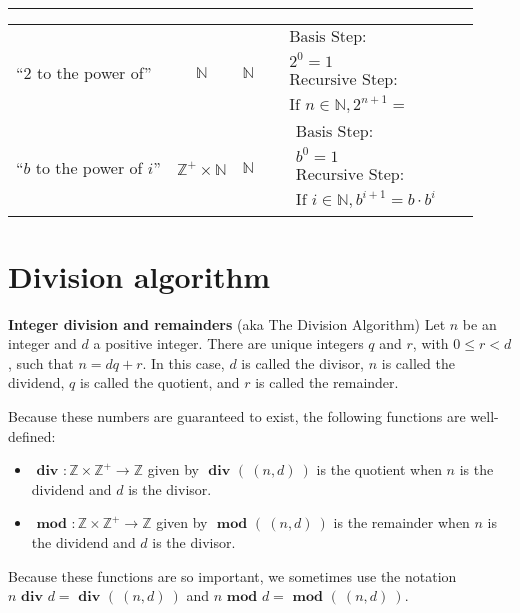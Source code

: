 \documentclass[12pt, oneside]{article}
\begin{document}
\begin{center}
\begin{tabular}{p{0.65in}ccp{2.4in}p{2.4in}}
{\begin{align*}
    \end{align*}}\\
\hline
``$2$ to the power of''& $\mathbb{N}$ & $\mathbb{N}$ & 
{\begin{align*}    
&\textrm{Basis Step:} \\
&2^0= 1 \\
&\textrm{Recursive Step:}\\
&\textrm{If } n \in \mathbb{N}, 2^{n+1} = \phantom{2 \cdot 2^n}
\end{align*}}\\
\hline
``$b$ to the power of $i$''& $\mathbb{Z}^+ \times \mathbb{N}$ & $\mathbb{N}$ & 
{\begin{align*}    
&\textrm{Basis Step:} \\
&b^0 = 1 \\
&\textrm{Recursive Step:}\\
&\textrm{If } i \in \mathbb{N}, b^{i+1} = b \cdot b^i
\end{align*}}
\end{tabular}
\end{center}

\newpage \vfill
\section*{Division algorithm}


{\bf Integer division and remainders} (aka The Division Algorithm) Let $n$ be an integer 
and $d$ a positive integer. There are unique integers $q$ and $r$, with $0 \leq r < d$, such that 
$n = dq + r$. In this case, $d$ is called the divisor, $n$ is called the dividend, 
$q$ is called the quotient, 
and $r$ is called the remainder. 

Because these numbers are guaranteed to exist, the following functions are well-defined: 
\begin{itemize}\setlength{\leftmargin}{-0.25in}
\item $\textbf{ div } : \mathbb{Z} \times \mathbb{Z}^+ \to \mathbb{Z}$ given by $\textbf{ div } ( ~(n,d)~)$ 
is the quotient when $n$ is the dividend and $d$ is the divisor.
\item $\textbf{ mod } : \mathbb{Z} \times \mathbb{Z}^+ \to \mathbb{Z}$ given by $\textbf{ mod } ( ~(n,d)~)$ 
is the remainder when $n$ is the dividend and $d$ is the divisor.
\end{itemize}
Because these functions are so important, we sometimes use the notation
$n \textbf{ div } d = \textbf{ div } ( ~(n,d)~)$ and $n \textbf{ mod } d = \textbf{ mod } (~(n,d)~)$.
\end{document}
